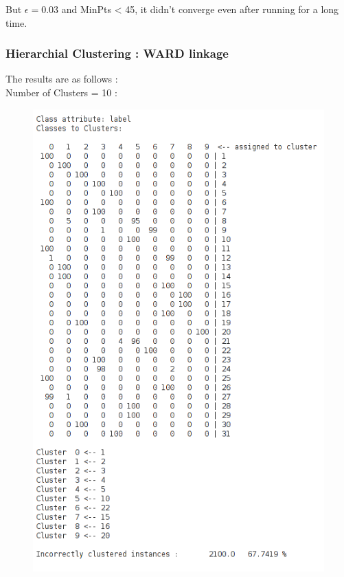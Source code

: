 \documentclass[paper=a4, fontsize=11pt]{scrartcl}
\numberwithin{equation}{section}		%
\numberwithin{figure}{section}			%
\numberwithin{table}{section}				%
\begin{document}
But $\epsilon = 0.03$ and MinPts < 45, it didn't converge even after running for a long time.

\subsubsection*{Hierarchial Clustering : WARD linkage}
The results are as follows :\\
Number of Clusters = 10 :
\begin{figure}[H]
	\centering
  \includegraphics[width=1\textwidth]{6db6}
\end{figure}
\end{document}
